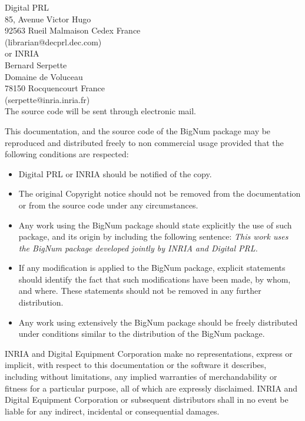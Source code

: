     Digital PRL\\			
    85, Avenue Victor Hugo\\ 
    92563 Rueil Malmaison Cedex  France\\         
    (librarian@decprl.dec.com) \\

 or INRIA\\			
    Bernard Serpette\\
    Domaine de Voluceau\\ 
    78150 Rocquencourt  France\\
    (serpette@inria.inria.fr)\\

  The source code will be sent through electronic mail.

This documentation, and the source code of the BigNum package may
be reproduced and distributed freely to non commercial usage provided
that the following conditions are respected:
\begin{itemize}
   \item Digital PRL or INRIA should be notified of the copy.

   \item The original Copyright notice should not be removed from the
   documentation or from the source code under any circumstances.
 
   \item Any work using the BigNum package should state explicitly the use
   of such package, and its origin by including the following sentence:
   {\em This work uses the BigNum package developed jointly by INRIA and
   Digital PRL.}

   \item If any modification is applied to the BigNum package,
   explicit statements should identify the fact that such modifications
   have been made, by whom, and where. These statements should not be
   removed in any further distribution.
 
   \item Any work using extensively the BigNum package should be freely
   distributed under conditions similar to the distribution of the
   BigNum package.
\end{itemize}
INRIA and Digital Equipment Corporation make no representations, 
express or implicit, with
respect to this documentation or the software it describes, including
without limitations, any implied warranties of merchandability or
fitness for a particular purpose, all of which are expressly
disclaimed. INRIA and Digital Equipment Corporation  or subsequent distributors 
shall in no event
be liable for any indirect, incidental or consequential damages.

